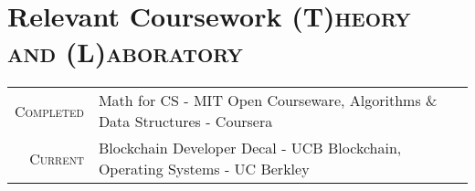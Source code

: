 \documentclass[a4paper,10pt]{extarticle} %
\begin{document}
\vspace{-0.05cm}
\section{\textcolor{primary}{Relevant Coursework}
\hfill\small\textsc{(T)heory and (L)aboratory}}

\begin{tabular}{r|p{15cm}}
\textsc{Completed} & Math for CS - MIT Open Courseware, Algorithms \& Data Structures - Coursera  \\
\textsc{Current} & Blockchain Developer Decal - UCB Blockchain, Operating Systems - UC Berkley
\end{tabular}

\end{document}
